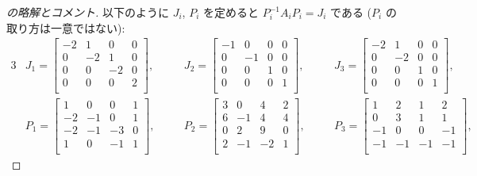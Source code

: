 \documentclass[12pt,twoside]{jarticle}
\begin{document}
\begin{proof}[\protect{[158]}の略解とコメント]
以下のように $J_i$, $P_i$ を定めると $P_i^{-1}A_iP_i=J_i$ である
($P_i$ の取り方は一意ではない):
{\small
\begin{alignat*}{3}
  &
  J_1 =
  \begin{bmatrix}
    -2 &  1 &  0 &  0 \\
     0 & -2 &  1 &  0 \\
     0 &  0 & -2 &  0 \\
     0 &  0 &  0 &  2 \\
  \end{bmatrix},
  & \quad &
  J_2 =
  \begin{bmatrix}
    -1 &  0 &  0 &  0 \\
     0 & -1 &  0 &  0 \\
     0 &  0 &  1 &  0 \\
     0 &  0 &  0 &  1 \\
  \end{bmatrix},
  & \quad &
  J_3 =
  \begin{bmatrix}
    -2 &  1 &  0 &  0 \\
     0 & -2 &  0 &  0 \\
     0 &  0 &  1 &  0 \\
     0 &  0 &  0 &  1 \\
  \end{bmatrix},
  \\ &
  P_1 =
  \begin{bmatrix}
     1 &  0 &  0 &  1 \\
    -2 & -1 &  0 &  1 \\
    -2 & -1 & -3 &  0 \\
     1 &  0 & -1 &  1 \\
  \end{bmatrix},
  & \quad &
  P_2 =
  \begin{bmatrix}
     3 &  0 &  4 &  2 \\
     6 & -1 &  4 &  4 \\
     0 &  2 &  9 &  0 \\
     2 & -1 & -2 &  1 \\
  \end{bmatrix},
  & \quad &
  P_3 =
  \begin{bmatrix}
     1 &  2 &  1 &  2 \\
     0 &  3 &  1 &  1 \\
    -1 &  0 &  0 & -1 \\
    -1 & -1 & -1 & -1 \\
  \end{bmatrix},

\end{alignat*}}
\end{proof}
\end{document}
